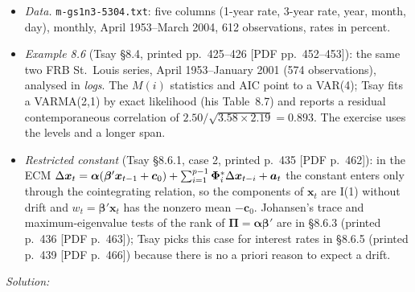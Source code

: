 \documentclass[11pt,a4paper]{article}
\newif\ifsolucoes
\newcommand{\espacoresol}{4.5cm}   %
\newenvironment{refmat}{\par\smallskip\noindent{\small\textbf{Referenced material.}}\begin{itemize}[leftmargin=1.4em,topsep=1pt,itemsep=1pt]\small}{\end{itemize}}
\newcommand{\resolespaco}{\ifsolucoes\else\par\textit{Solution:}\vspace{\espacoresol}\par\fi}
\newcommand{\bx}{\bm{x}}\newcommand{\ba}{\bm{a}}\newcommand{\bb}{\bm{b}}\newcommand{\br}{\bm{r}}
\begin{document}
\begin{refmat}
\item \textit{Data.} \texttt{m-gs1n3-5304.txt}: five columns (1-year rate, 3-year rate, year, month, day),
monthly, April 1953--March 2004, 612 observations, rates in percent.
\item \textit{Example 8.6} (Tsay \S8.4, printed pp.~425--426 [PDF pp.~452--453]): the same two FRB St.\ Louis
series, April 1953--January 2001 (574 observations), analysed in \emph{logs}. The $M(i)$ statistics and AIC
point to a VAR(4); Tsay fits a VARMA(2,1) by exact likelihood (his Table~8.7) and reports a residual
contemporaneous correlation of $2.50/\sqrt{3.58\times2.19}=0.893$. The exercise uses the levels and a longer span.
\item \textit{Restricted constant} (Tsay \S8.6.1, case 2, printed p.~435 [PDF p.~462]): in the ECM
$\Delta\bx_t=\bm\alpha(\bm\beta'\bx_{t-1}+\bm c_0)+\sum_{i=1}^{p-1}\bPhi_i^*\Delta\bx_{t-i}+\ba_t$ the constant
enters only through the cointegrating relation, so the components of $\bx_t$ are I(1) without drift and
$w_t=\bm\beta'\bx_t$ has the nonzero mean $-\bm c_0$. Johansen's trace and maximum-eigenvalue tests of the rank
of $\bm\Pi=\bm\alpha\bm\beta'$ are in \S8.6.3 (printed p.~436 [PDF p.~463]); Tsay picks this case for interest rates
in \S8.6.5 (printed p.~439 [PDF p.~466]) because there is no a priori reason to expect a drift.
\end{refmat}
\resolespaco
\end{document}
